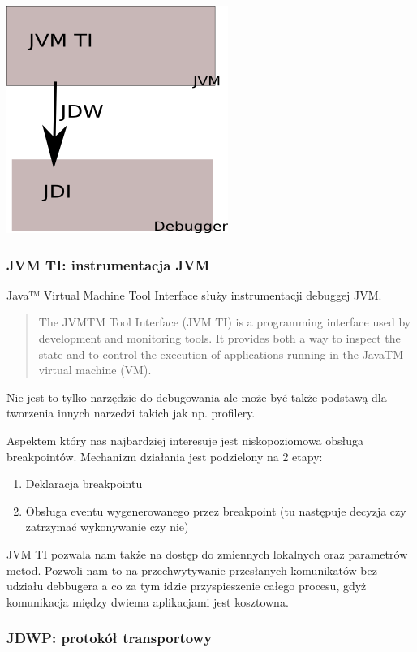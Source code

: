 \includegraphics{imgs/jdpa}

\subsubsection{JVM TI: instrumentacja JVM} 

Java™ Virtual Machine Tool Interface służy instrumentacji debuggej JVM.

\begin{quote}
The JVMTM Tool Interface (JVM TI) is a programming interface used by development and monitoring tools. It provides both a way to inspect the state and to control the execution of applications running in the JavaTM virtual machine (VM). \cite{jvmtiSpec}
\end{quote}

Nie jest to tylko narzędzie do debugowania ale może być także podstawą dla tworzenia innych narzedzi takich jak np. profilery.

Aspektem który nas najbardziej interesuje jest niskopoziomowa obsługa breakpointów. Mechanizm działania jest podzielony na 2 etapy:

\begin{enumerate}
\item Deklaracja breakpointu
\item Obsługa eventu wygenerowanego przez breakpoint (tu następuje decyzja czy zatrzymać wykonywanie czy nie)
\end{enumerate}
JVM TI pozwala nam także na dostęp do zmiennych lokalnych oraz parametrów metod. Pozwoli nam to na przechwytywanie przesłanych komunikatów bez udziału debbugera a co za tym idzie przyspieszenie całego procesu, gdyż komunikacja między dwiema aplikacjami jest kosztowna.


\subsubsection{JDWP: protokół transportowy}

